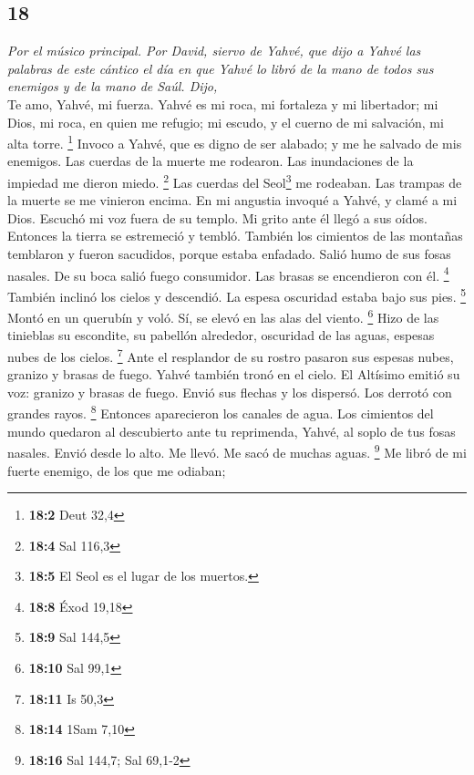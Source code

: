 \begin{paracol}{2}
\hypertarget{section-34}{%
\section{18}\label{section-34}}

\emph{Por el músico principal. Por David, siervo de Yahvé, que dijo a
Yahvé las palabras de este cántico el día en que Yahvé lo libró de la
mano de todos sus enemigos y de la mano de Saúl. Dijo,}\\
 Te amo, Yahvé, mi fuerza.  Yahvé es mi
roca, mi fortaleza y mi libertador; mi Dios, mi roca, en quien me
refugio; mi escudo, y el cuerno de mi salvación, mi alta torre.
\footnote{\textbf{18:2} Deut 32,4}  Invoco a Yahvé, que es
digno de ser alabado; y me he salvado de mis enemigos. 
Las cuerdas de la muerte me rodearon. Las inundaciones de la impiedad me
dieron miedo. \footnote{\textbf{18:4} Sal 116,3}  Las
cuerdas del Seol\footnote{\textbf{18:5} El Seol es el lugar de los
  muertos.} me rodeaban. Las trampas de la muerte se me vinieron encima.
 En mi angustia invoqué a Yahvé, y clamé a mi Dios.
Escuchó mi voz fuera de su templo. Mi grito ante él llegó a sus oídos.
 Entonces la tierra se estremeció y tembló. También los
cimientos de las montañas temblaron y fueron sacudidos, porque estaba
enfadado.  Salió humo de sus fosas nasales. De su boca
salió fuego consumidor. Las brasas se encendieron con él. \footnote{\textbf{18:8}
  Éxod 19,18}  También inclinó los cielos y descendió. La
espesa oscuridad estaba bajo sus pies. \footnote{\textbf{18:9} Sal 144,5}
 Montó en un querubín y voló. Sí, se elevó en las alas
del viento. \footnote{\textbf{18:10} Sal 99,1}  Hizo de
las tinieblas su escondite, su pabellón alrededor, oscuridad de las
aguas, espesas nubes de los cielos. \footnote{\textbf{18:11} Is 50,3}
 Ante el resplandor de su rostro pasaron sus espesas
nubes, granizo y brasas de fuego.  Yahvé también tronó en
el cielo. El Altísimo emitió su voz: granizo y brasas de fuego.
 Envió sus flechas y los dispersó. Los derrotó con
grandes rayos. \footnote{\textbf{18:14} 1Sam 7,10} 
Entonces aparecieron los canales de agua. Los cimientos del mundo
quedaron al descubierto ante tu reprimenda, Yahvé, al soplo de tus fosas
nasales.  Envió desde lo alto. Me llevó. Me sacó de
muchas aguas. \footnote{\textbf{18:16} Sal 144,7; Sal 69,1-2}
 Me libró de mi fuerte enemigo, de los que me odiaban;

\end{paracol}
